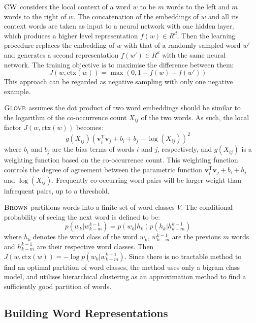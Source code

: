 \documentclass[11pt]{article}
\newcommand{\method}[2][]{\ensuremath{\textsc{#2#1}}\xspace}
\newcommand{\brown}[1][]{\method[\ensuremath{_{#1}}]{Brown}}
\newcommand{\CW}[1][]{\method[#1]{CW}}
\newcommand{\Glove}[1][]{\method[#1]{Glove}}
\newcommand{\ctx}{\ensuremath{\text{ctx}}}
\begin{document}
\CW considers the local context of a word $w$ to be $m$ words to the left
and $m$ words to the right of $w$. The concatenation of the embeddings of
$w$ and all its context words are taken as input to a neural network
with one hidden layer, which produces a higher level representation
$f(w) \in R^d$. Then the learning procedure replaces the embedding of
$w$ with that of a randomly sampled word $w'$ and generates a second
representation $f(w') \in R^d$ with the same neural network. The
training objective is to maximise the difference between them:
\begin{displaymath}
J(w, \ctx(w)) = \max (0, 1 - f(w) + f(w'))
\end{displaymath}
This approach can be regarded as negative sampling with only one negative example.

\Glove assumes the dot product of two word embeddings should be similar
to the logarithm of the co-occurrence count $X_{ij}$ of the two
words. As such, the local factor $J(w, \ctx(w))$ becomes:
\begin{displaymath}
g(X_{ij}) (\mathbf{v}_i^{\text{T}} \mathbf{v}_j + b_i + b_j - \log(X_{ij}))^2
\end{displaymath}
where $b_i$ and $b_j$ are the bias terms of words $i$ and $j$,
respectively, and $g(X_{ij})$ is a weighting function based on the
co-occurrence count. This weighting function controls the degree of
agreement between the parametric function $\mathbf{v}_i^{\text{T}}
\mathbf{v}_j + b_i + b_j $ and $\log(X_{ij})$. Frequently co-occurring
word pairs will be larger weight
than infrequent
pairs, up to a threshold.

\brown partitions words into a finite set of word classes $V$. The
conditional probability of seeing the next word is defined to be:
\begin{displaymath}
p(w_k | w_{k - m}^{k -1}) = p(w_k | h_k) p(h_k | h_{k - m}^{k -1})
\end{displaymath}
where $h_k$ denotes the word class of the word $w_k$, $w_{k - m}^{k -1}$
are the previous $m$ words and $h_{k - m}^{k -1}$ are their respective
word classes. Then $J(w, \text{ctx}(w)) = - \log p(w_k | w_{k - m}^{k
  -1}) $. Since there is no tractable method to find an optimal
partition of word classes, the method uses only a bigram class model, and utilises hierarchical clustering as an approximation method to find a sufficiently good partition of words. 

\subsection{Building Word Representations}
\label{buildingWordRep}
\end{document}
